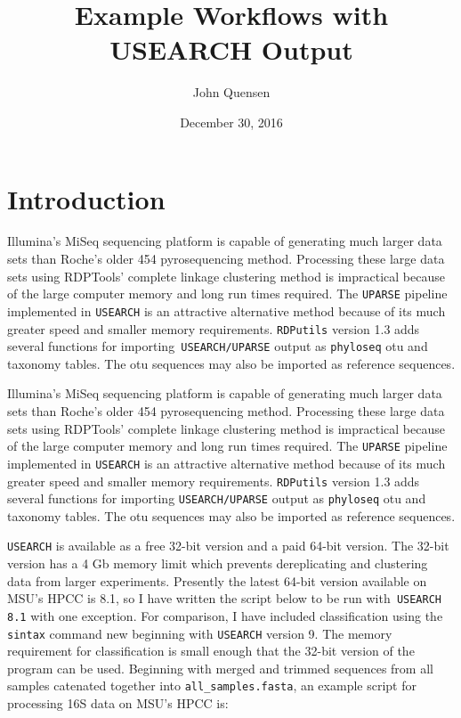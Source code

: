 \documentclass{article}
\title{Example Workflows with USEARCH Output}
\author{John Quensen}
\date{December 30, 2016}
\begin{document}


\maketitle

\section*{Introduction}

Illumina's MiSeq sequencing platform is capable of generating much larger data sets than Roche's older 454 pyrosequencing method. Processing these large data sets using RDPTools' complete linkage clustering method is impractical because of the large computer memory and long run times required.  The \texttt{UPARSE} pipeline implemented in \texttt{USEARCH} is an attractive alternative method because of its much greater speed and smaller memory requirements.  \texttt{RDPutils} version 1.3 adds several functions for importing\texttt{ USEARCH/UPARSE} output as \texttt{phyloseq} otu and taxonomy tables. The otu sequences may also be imported as reference sequences.    

Illumina's MiSeq sequencing platform is capable of generating much larger data sets than Roche's older 454 pyrosequencing method. Processing these large data sets using RDPTools' complete linkage clustering method is impractical because of the large computer memory and long run times required.  The \texttt{UPARSE} pipeline implemented in \texttt{USEARCH} is an attractive alternative method because of its much greater speed and smaller memory requirements.  \texttt{RDPutils} version 1.3 adds several functions for importing \texttt{USEARCH/UPARSE} output as \texttt{phyloseq} otu and taxonomy tables. The otu sequences may also be imported as reference sequences.    

\texttt{USEARCH} is available as a free 32-bit version and a paid 64-bit version. The 32-bit version has a 4 Gb memory limit which prevents dereplicating and clustering data from larger experiments. Presently the latest 64-bit version available on MSU's HPCC is 8.1, so I have written the script below to be run with\texttt{ USEARCH 8.1} with one exception. For comparison, I have included classification using the \texttt{sintax} command new beginning with \texttt{USEARCH} version 9. The memory requirement for classification is small enough that the 32-bit version of the program can be used. 
Beginning with merged and trimmed sequences from all samples catenated together into 
\texttt{all\_samples.fasta}, an example script for processing 16S data on MSU's HPCC is:  
\end{document}
